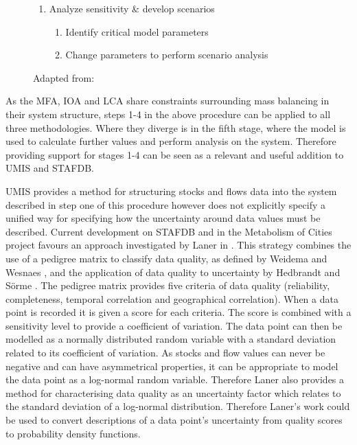 \documentclass[ %
                    author={Tom Jager},
                supervisor={Dr. Daniel Schien},
                    degree={MEng},
                     title={A Bayesian Inference Engine for UMIS Structured Data},
                  subtitle={},
                      type={research},
                      year={2019} ]{dissertation}
\begin{document}
\begin{figure}[t]
\begin{enumerate}
        \item Analyze sensitivity \& develop scenarios
        \begin{enumerate}
            \item Identify critical model parameters
            \item Change parameters to perform scenario analysis
        \end{enumerate}
    \end{enumerate}
    \caption{Adapted from: \cite{laner2014systematic}}
    \label{fig:incorp uncertainty procedure}
\end{figure}

% 
As the MFA, IOA and LCA share constraints surrounding mass balancing in their system structure, steps 1-4 in the above procedure can be applied to all three methodologies. Where they diverge is in the fifth stage, where the model is used to calculate further values and perform analysis on the system. Therefore providing support for stages 1-4 can be seen as a relevant and useful addition to UMIS and STAFDB.

UMIS provides a method for structuring stocks and flows data into the system described in step one of this procedure however does not explicitly specify a unified way for specifying how the uncertainty around data values must be described. Current development on STAFDB and in the Metabolism of Cities project favours an approach investigated by Laner in \cite{laner2016novel}. This strategy combines the use of a pedigree matrix to classify data quality, as defined by Weidema and Wesnaes \cite{weidema1996data}, and the application of data quality to uncertainty by Hedbrandt and S\"orme \cite{hedbrant2001data}. The pedigree matrix provides five criteria of data quality (reliability, completeness, temporal correlation and geographical correlation). When a data point is recorded it is given a score for each criteria. The score is combined with a sensitivity level to provide a coefficient of variation. The data point can then be modelled as a normally distributed random variable with a standard deviation related to its coefficient of variation. As stocks and flow values can never be negative and can have asymmetrical properties, it can be appropriate to model the data point as a log-normal random variable. Therefore Laner also provides a method for characterising data quality as an uncertainty factor which relates to the standard deviation of a log-normal distribution. Therefore Laner's work could be used to convert descriptions of a data point's uncertainty from quality scores to probability density functions.
\end{document}
